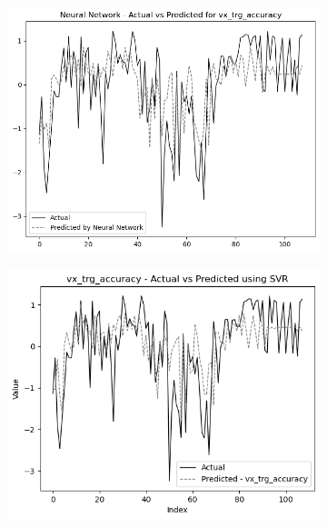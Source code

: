 \begin{figure}
    \begin{subfigure}[b]{0.49\textwidth}
        \centering
        \includegraphics[width=\textwidth]{images/nnCharts/all_data_visual_target_accuracy.png}
    \end{subfigure}\hfill
    \begin{subfigure}[b]{0.49\textwidth}
        \centering
        \includegraphics[width=\textwidth]{images/regressionCharts/all_data_visual_target_accuracy.png}
    \end{subfigure}


\end{figure}
